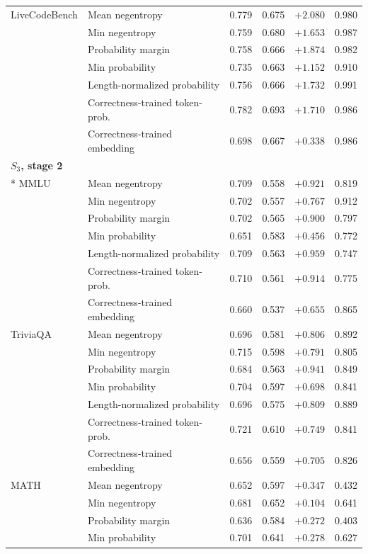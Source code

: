 \begin{longtable}{llrrrr}
LiveCodeBench & Mean negentropy & 0.779 & 0.675 & $+2.080$ & 0.980 \\
 & Min negentropy & 0.759 & 0.680 & $+1.653$ & 0.987 \\
 & Probability margin & 0.758 & 0.666 & $+1.874$ & 0.982 \\
 & Min probability & 0.735 & 0.663 & $+1.152$ & 0.910 \\
 & Length-normalized probability & 0.756 & 0.666 & $+1.732$ & 0.991 \\
 & Correctness-trained token-prob. &0.782 & 0.693 & $+1.710$ & 0.986 \\
 & Correctness-trained embedding &0.698 & 0.667 & $+0.338$ & 0.986 \\
\multicolumn{6}{l}{\textbf{$S_3$, stage 2}} \\*
\midrule
MMLU & Mean negentropy & 0.709 & 0.558 & $+0.921$ & 0.819 \\
 & Min negentropy & 0.702 & 0.557 & $+0.767$ & 0.912 \\
 & Probability margin & 0.702 & 0.565 & $+0.900$ & 0.797 \\
 & Min probability & 0.651 & 0.583 & $+0.456$ & 0.772 \\
 & Length-normalized probability & 0.709 & 0.563 & $+0.959$ & 0.747 \\
 & Correctness-trained token-prob. &0.710 & 0.561 & $+0.914$ & 0.775 \\
 & Correctness-trained embedding &0.660 & 0.537 & $+0.655$ & 0.865 \\
TriviaQA & Mean negentropy & 0.696 & 0.581 & $+0.806$ & 0.892 \\
 & Min negentropy & 0.715 & 0.598 & $+0.791$ & 0.805 \\
 & Probability margin & 0.684 & 0.563 & $+0.941$ & 0.849 \\
 & Min probability & 0.704 & 0.597 & $+0.698$ & 0.841 \\
 & Length-normalized probability & 0.696 & 0.575 & $+0.809$ & 0.889 \\
 & Correctness-trained token-prob. &0.721 & 0.610 & $+0.749$ & 0.841 \\
 & Correctness-trained embedding &0.656 & 0.559 & $+0.705$ & 0.826 \\
MATH & Mean negentropy & 0.652 & 0.597 & $+0.347$ & 0.432 \\
 & Min negentropy & 0.681 & 0.652 & $+0.104$ & 0.641 \\
 & Probability margin & 0.636 & 0.584 & $+0.272$ & 0.403 \\
 & Min probability & 0.701 & 0.641 & $+0.278$ & 0.627 \\

\end{longtable}
